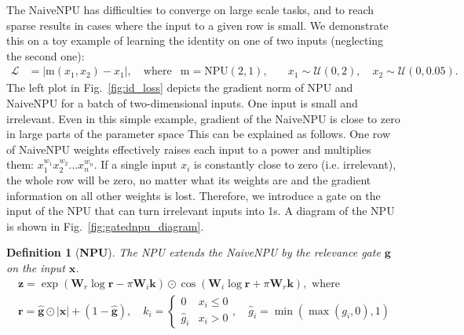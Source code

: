 \documentclass[9pt]{article}
\newtheorem*{definition}{Definition}
\newcommand{\Wre}{\bm W_{r}}
\newcommand{\Wim}{\bm W_{i}}
\newcommand{\npu}{\text{NPU}}
\begin{document}
The NaiveNPU has difficulties to converge on large scale tasks, and to reach
sparse results in cases where the input to a given row is small. We
demonstrate this on a toy example of learning the identity on one of two inputs
(neglecting the second one):
\begin{align}
  \nonumber
  \mathcal{L} &= |\text{m}(x_1,x_2) - x_1|, \quad \text{where}
  & \text{m} = \npu(2,1), \quad
  &x_1 \sim \mathcal U(0,2), \quad x_2 \sim \mathcal U(0,0.05).
\end{align}
The left plot in Fig.~\ref{fig:id_loss} depicts the gradient norm of NPU and
NaiveNPU for a batch of two-dimensional inputs. One input is small and
irrelevant. Even in this simple example, gradient of the NaiveNPU is close to
zero in large parts of the parameter space This can be explained as follows.
One row of NaiveNPU weights effectively raises each input to a power and
multiplies them: $x_1^{w_1} x_2^{w_2} \dots x_n^{w_n}$. If a single input $x_i$
is constantly close to zero (i.e. irrelevant), the whole row will be zero, no
matter what its weights are and the gradient information on all other weights
is lost.  Therefore, we introduce a gate on the input of the NPU that can turn
irrelevant inputs into 1s.
A diagram of the NPU is shown in Fig.~\ref{fig:gatednpu_diagram}.
\begin{definition}[{\bf NPU}]
  The NPU extends the NaiveNPU by the relevance gate $\bm g$ on the input $\bm x$.
   \begin{gather}
    \label{eq:gatednpu_def}
    \bm z = \exp(\Wre \log\bm r - \pi\Wim\bm k) 
          \odot \cos(\Wim\log \bm r + \pi\Wre\bm k), \text{ where } \\
    \bm r = \bm{\hat g} \odot |\bm x| + (1-\bm{\hat g}),
    \quad
    k_i = \begin{cases}
       0  & x_i \leq 0 \\
      \hat g_i & x_i > 0
    \end{cases},
    \quad
    \hat g_i = \min(\max(g_i,0),1)
  \end{gather}
\end{definition}
\end{document}
